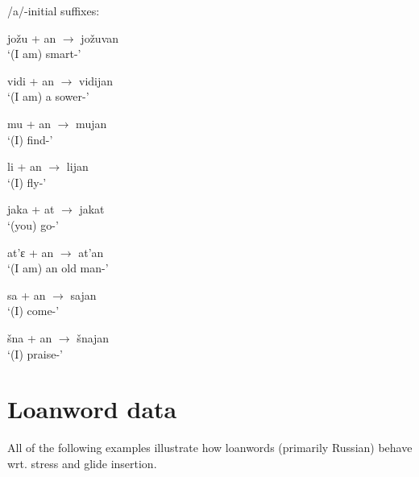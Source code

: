 \documentclass[a4paper, 12pt]{article}
\begin{document}
	/a/-initial suffixes:

\begin{minipage}[t]{.45\linewidth}
\ex\label{ex:jozu}
	jožu + an $\rightarrow$ jožuvan \\`(I am) smart-{\Fsg}' 
\xe
\end{minipage}
\hfill
\begin{minipage}[t]{.45\linewidth}
\ex\label{ex:vidi}
	vidi + an $\rightarrow$ vidijan \\`(I am) a sower-{\Fsg}' 
\xe
\end{minipage}

\begin{minipage}[t]{.45\linewidth}
\ex\label{ex:mu}
	mu + an $\rightarrow$ mujan \\`(I) find-{\Fsg}' 
\xe
\end{minipage}
\hfill
\begin{minipage}[t]{.45\linewidth}
\ex\label{ex:li}
	li + an $\rightarrow$ lijan \\`(I) fly-{\Fsg}' 
\xe
\end{minipage}		

\begin{minipage}[t]{.45\linewidth}
\ex\label{ex:jaka}
	jaka + at $\rightarrow$ jakat \\`(you) go-{\Ssg}'
\xe
\end{minipage}
\hfill
\begin{minipage}[t]{.45\linewidth}
\ex\label{ex:atya}
	at'ɛ + an $\rightarrow$ at'an \\`(I am) an old man-{\Fsg}' 
\xe
\end{minipage}	

\begin{minipage}[t]{.45\linewidth}
\ex\label{ex:sa}
	sa + an $\rightarrow$ sajan \\`(I) come-{\Fsg}' \\ \parencite[p. 57]{kozlov2018}
\xe
\end{minipage}
\hfill
\begin{minipage}[t]{.45\linewidth}
\ex\label{ex:shna}
	šna + an $\rightarrow$ šnajan \\`(I) praise-{\Fsg}'
\xe
\end{minipage}	

	\section{Loanword data}
	
	All of the following examples illustrate how loanwords (primarily Russian) behave wrt. stress and glide insertion. 
	
\end{document}

